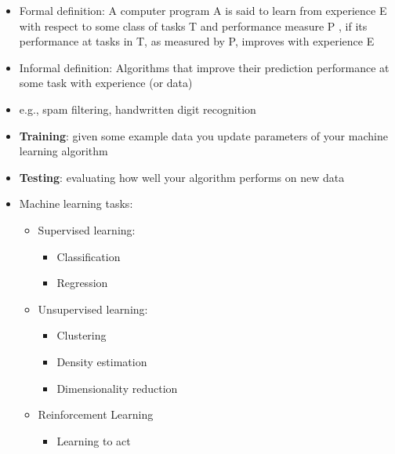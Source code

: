 \begin{itemize}
	\item Formal definition: A computer program A is said to learn from experience E with respect to some class of tasks T and performance measure P , if its performance at tasks in T, as measured by P, improves with experience E
	\item Informal definition: Algorithms that improve their prediction performance at some task with experience (or data)
	\item e.g., spam filtering, handwritten digit recognition
	\item \textbf{Training}: given some example data you update parameters of your machine learning algorithm
	\item \textbf{Testing}: evaluating how well your algorithm performs on new data
	\item Machine learning tasks:
	\begin{itemize}
		\item Supervised learning:
		\begin{itemize}
			\item Classification 
			\item Regression
		\end{itemize}
		\item Unsupervised learning:
		\begin{itemize}
			\item Clustering
			\item Density estimation
			\item Dimensionality reduction
		\end{itemize}
		\item Reinforcement Learning
		\begin{itemize}
			\item Learning to act
		\end{itemize}
	\end{itemize}
\end{itemize}


